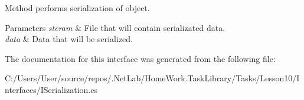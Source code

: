 Method performs serialization of object. 


\begin{DoxyParams}{Parameters}
{\em steram} & File that will contain serializated data.\\
\hline
{\em data} & Data that will be serialized.\\
\hline
\end{DoxyParams}


The documentation for this interface was generated from the following file\+:\begin{DoxyCompactItemize}
\item 
C\+:/\+Users/\+User/source/repos/.\+Net\+Lab/\+Home\+Work.\+Task\+Library/\+Tasks/\+Lesson10/\+Interfaces/I\+Serialization.\+cs\end{DoxyCompactItemize}
